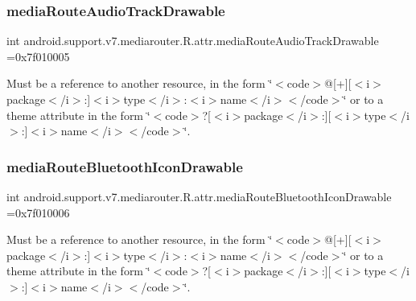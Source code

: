 \subsubsection{\texorpdfstring{media\+Route\+Audio\+Track\+Drawable}{mediaRouteAudioTrackDrawable}}
{\footnotesize\ttfamily int android.\+support.\+v7.\+mediarouter.\+R.\+attr.\+media\+Route\+Audio\+Track\+Drawable =0x7f010005\hspace{0.3cm}{\ttfamily [static]}}

Must be a reference to another resource, in the form \char`\"{}$<$code$>$@\mbox{[}+\mbox{]}\mbox{[}$<$i$>$package$<$/i$>$\+:\mbox{]}$<$i$>$type$<$/i$>$\+:$<$i$>$name$<$/i$>$$<$/code$>$\char`\"{} or to a theme attribute in the form \char`\"{}$<$code$>$?\mbox{[}$<$i$>$package$<$/i$>$\+:\mbox{]}\mbox{[}$<$i$>$type$<$/i$>$\+:\mbox{]}$<$i$>$name$<$/i$>$$<$/code$>$\char`\"{}. \mbox{\label{classandroid_1_1support_1_1v7_1_1mediarouter_1_1R_1_1attr_ad202920b84b31694684d79257bd7936b}} 
\subsubsection{\texorpdfstring{media\+Route\+Bluetooth\+Icon\+Drawable}{mediaRouteBluetoothIconDrawable}}
{\footnotesize\ttfamily int android.\+support.\+v7.\+mediarouter.\+R.\+attr.\+media\+Route\+Bluetooth\+Icon\+Drawable =0x7f010006\hspace{0.3cm}{\ttfamily [static]}}

Must be a reference to another resource, in the form \char`\"{}$<$code$>$@\mbox{[}+\mbox{]}\mbox{[}$<$i$>$package$<$/i$>$\+:\mbox{]}$<$i$>$type$<$/i$>$\+:$<$i$>$name$<$/i$>$$<$/code$>$\char`\"{} or to a theme attribute in the form \char`\"{}$<$code$>$?\mbox{[}$<$i$>$package$<$/i$>$\+:\mbox{]}\mbox{[}$<$i$>$type$<$/i$>$\+:\mbox{]}$<$i$>$name$<$/i$>$$<$/code$>$\char`\"{}. \mbox{\label{classandroid_1_1support_1_1v7_1_1mediarouter_1_1R_1_1attr_a890cab55c821c0c023da2e86f56103b4}} 
